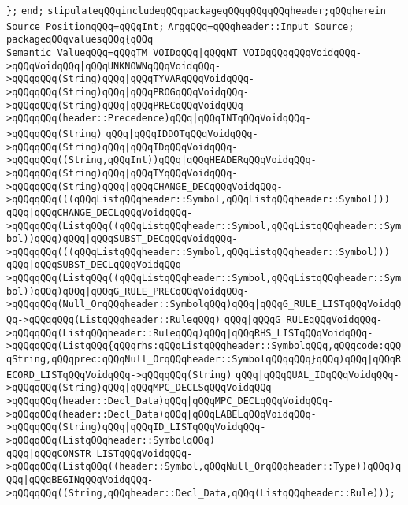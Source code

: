 \verb|};|\newline
\verb|end;|\newline
\verb|stipulateqQQqincludeqQQqpackageqQQqqQQqqQQqheader;qQQqherein|\newline
\verb|Source_PositionqQQq=qQQqInt;|\newline
\verb|ArgqQQq=qQQqheader::Input_Source;|\newline
\verb|packageqQQqvaluesqQQq{qQQq|\newline
\verb|Semantic_ValueqQQq=qQQqTM_VOIDqQQq|\verb#|qQQqNT_VOIDqQQqqQQqVoidqQQq->qQQqVoidqQQq|qQQqUNKNOWNqQQqVoidqQQq->qQQqqQQq(String)qQQq|qQQqTYVARqQQqVoidqQQq->qQQqqQQq(String)qQQq|qQQqPROGqQQqVoidqQQq->qQQqqQQq(String)qQQq|qQQqPRECqQQqVoidqQQq->qQQqqQQq(header::Precedence)qQQq|qQQqINTqQQqVoidqQQq->qQQqqQQq(String)#\newline
\verb|qQQq|\verb#|qQQqIDDOTqQQqVoidqQQq->qQQqqQQq(String)qQQq|qQQqIDqQQqVoidqQQq->qQQqqQQq((String,qQQqInt))qQQq|qQQqHEADERqQQqVoidqQQq->qQQqqQQq(String)qQQq|qQQqTYqQQqVoidqQQq->qQQqqQQq(String)qQQq|qQQqCHANGE_DECqQQqVoidqQQq->qQQqqQQq(((qQQqListqQQqheader::Symbol,qQQqListqQQqheader::Symbol)))#\newline
\verb|qQQq|\verb#|qQQqCHANGE_DECLqQQqVoidqQQq->qQQqqQQq(ListqQQq((qQQqListqQQqheader::Symbol,qQQqListqQQqheader::Symbol))qQQq)qQQq|qQQqSUBST_DECqQQqVoidqQQq->qQQqqQQq(((qQQqListqQQqheader::Symbol,qQQqListqQQqheader::Symbol)))#\newline
\verb|qQQq|\verb#|qQQqSUBST_DECLqQQqVoidqQQq->qQQqqQQq(ListqQQq((qQQqListqQQqheader::Symbol,qQQqListqQQqheader::Symbol))qQQq)qQQq|qQQqG_RULE_PRECqQQqVoidqQQq->qQQqqQQq(Null_OrqQQqheader::SymbolqQQq)qQQq|qQQqG_RULE_LISTqQQqVoidqQQq->qQQqqQQq(ListqQQqheader::RuleqQQq)#\newline
\verb|qQQq|\verb#|qQQqG_RULEqQQqVoidqQQq->qQQqqQQq(ListqQQqheader::RuleqQQq)qQQq|qQQqRHS_LISTqQQqVoidqQQq->qQQqqQQq(ListqQQq{qQQqrhs:qQQqListqQQqheader::SymbolqQQq,qQQqcode:qQQqString,qQQqprec:qQQqNull_OrqQQqheader::SymbolqQQqqQQq}qQQq)qQQq|qQQqRECORD_LISTqQQqVoidqQQq->qQQqqQQq(String)#\newline
\verb|qQQq|\verb#|qQQqQUAL_IDqQQqVoidqQQq->qQQqqQQq(String)qQQq|qQQqMPC_DECLSqQQqVoidqQQq->qQQqqQQq(header::Decl_Data)qQQq|qQQqMPC_DECLqQQqVoidqQQq->qQQqqQQq(header::Decl_Data)qQQq|qQQqLABELqQQqVoidqQQq->qQQqqQQq(String)qQQq|qQQqID_LISTqQQqVoidqQQq->qQQqqQQq(ListqQQqheader::SymbolqQQq)#\newline
\verb|qQQq|\verb#|qQQqCONSTR_LISTqQQqVoidqQQq->qQQqqQQq(ListqQQq((header::Symbol,qQQqNull_OrqQQqheader::Type))qQQq)qQQq|qQQqBEGINqQQqVoidqQQq->qQQqqQQq((String,qQQqheader::Decl_Data,qQQq(ListqQQqheader::Rule)));#\newline
